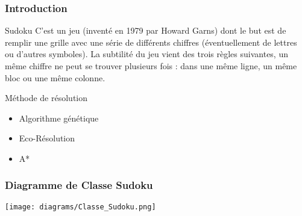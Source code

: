 
\begin{frame}
    \frametitle{Introduction}
    \begin{block}{Sudoku}
    			C’est un jeu (inventé en 1979 par Howard Garns) dont le but est de remplir une grille avec une série de
différents chiffres (éventuellement de lettres ou d’autres symboles). La subtilité du jeu vient des trois règles
suivantes, un même chiffre ne peut se trouver plusieurs fois : dans une même ligne, un même bloc ou une même colonne.
    \end{block}
    \begin{block}{Méthode de résolution}
    		\begin{itemize}
    			\item Algorithme génétique
    			\item Eco-Résolution
    			\item A*
    		\end{itemize}
    \end{block}
\end{frame}

\begin{frame}
	\frametitle{Diagramme de Classe Sudoku}
	\begin{center}
	 \texttt{[image: diagrams/Classe\_Sudoku.png]}
	\end{center}

\end{frame}